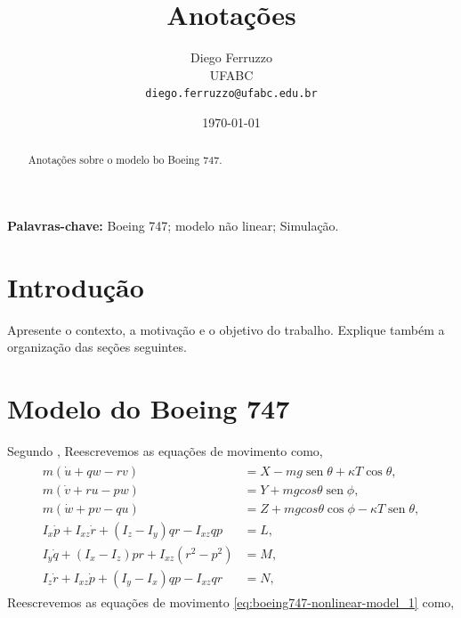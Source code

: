 \documentclass[12pt,a4paper]{article}
\title{Anotações}
\author{Diego Ferruzzo\\
  \small UFABC \\
  \small \texttt{diego.ferruzzo@ufabc.edu.br}}
\date{\today}
\DeclareMathOperator{\sen}{sen}
\begin{document}
\maketitle

\begin{abstract}
Anotações sobre o modelo bo Boeing 747.
\end{abstract}

\noindent\textbf{Palavras-chave:} Boeing 747; modelo não linear; Simulação.

\section{Introdução}
Apresente o contexto, a motivação e o objetivo do trabalho. Explique também a
organização das seções seguintes.

\section{Modelo do Boeing 747}
Segundo \cite{franklin2013,brysonControlSpacecraftAircraft1994},
Reescrevemos as equações de movimento como,
\begin{align}
    \begin{split}
        m(\dot{u} + qw - rv) &= X - mg\sen\theta + \kappa T \cos\theta,\\
        m(\dot{v} + ru - pw) &= Y + mg cos\theta \sen\phi,\\
        m(\dot{w} + pv - qu) &= Z + mg cos\theta \cos\phi - \kappa T \sen\theta,\\
        I_x \dot{p} + I_{xz} \dot{r} + (I_z - I_y)qr - I_{xz}qp &= L,\\
        I_y \dot{q} + (I_x - I_z)pr + I_{xz}(r^2 - p^2) &= M,\\
        I_z \dot{r} + I_{xz} \dot{p} + (I_y - I_x)qp - I_{xz}qr &= N,
    \end{split}
    \label{eq:boeing747-nonlinear-model_1}
\end{align}
Reescrevemos as equações de movimento \eqref{eq:boeing747-nonlinear-model_1} como,
\end{document}
